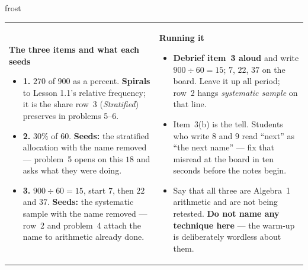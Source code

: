 \documentclass[10pt]{article}
\begin{document}
\begin{fixedskillbox}{frost}
\begin{tabularx}{\linewidth}{@{}X X@{}}
\begin{minipage}[t]{\linewidth}\vspace{0pt}
    \textbf{The three items and what each seeds}
    \begin{itemize}[leftmargin=1.1em, itemsep=1pt, topsep=2pt]
      \item \textbf{1.} $270$ of $900$ as a percent. \textbf{Spirals} to Lesson 1.1's relative
            frequency; it is the share row~3 (\emph{Stratified}) preserves in problems 5--6.
      \item \textbf{2.} $30\%$ of $60$. \textbf{Seeds:} the stratified allocation with the
            name removed --- problem~5 opens on this $18$ and asks what they were doing.
      \item \textbf{3.} $900 \div 60 = 15$, start $7$, then $22$ and $37$. \textbf{Seeds:} the
            systematic sample with the name removed --- row~2 and problem~4 attach the name to
            arithmetic already done.
    \end{itemize}
\end{minipage}
&
\begin{minipage}[t]{\linewidth}\vspace{0pt}
    \textbf{Running it}
    \begin{itemize}[leftmargin=1.1em, itemsep=1pt, topsep=2pt]
      \item \textbf{Debrief item~3 aloud} and write $900 \div 60 = 15$; $7$, $22$, $37$ on the
            board. Leave it up all period; row~2 hangs \emph{systematic sample} on that line.
      \item Item~3(b) is the tell. Students who write $8$ and $9$ read ``next'' as ``the next
            name'' --- fix that misread at the board in ten seconds before the notes begin.
      \item Say that all three are Algebra~1 arithmetic and are not being retested. \textbf{Do
            not name any technique here} --- the warm-up is deliberately wordless about them.
    \end{itemize}
\end{minipage}
\end{tabularx}
\end{fixedskillbox}
\end{document}
